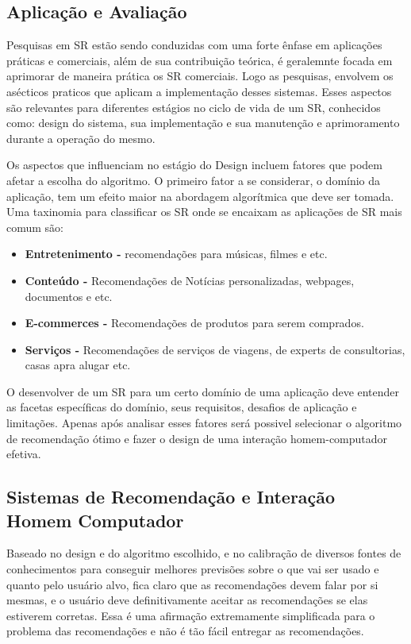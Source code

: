\subsection{Aplicação e Avaliação}
Pesquisas em SR estão sendo conduzidas com uma forte ênfase em aplicações práticas e comerciais, além de sua contribuição teórica, é geralemnte focada em aprimorar de maneira prática os SR comerciais. Logo as pesquisas, envolvem os asécticos praticos que aplicam a implementação desses sistemas. Esses aspectos são relevantes para diferentes estágios no ciclo de vida de um SR, conhecidos como: design do sistema, sua implementação e sua manutenção e aprimoramento durante a operação do mesmo.
\par
Os aspectos que influenciam no estágio do Design incluem fatores que podem afetar a escolha do algoritmo. O primeiro fator a se considerar, o domínio da aplicação, tem um efeito maior na abordagem algorítmica que deve ser tomada. Uma taxinomia para classificar os SR onde se encaixam as aplicações de SR mais comum são:

\begin{itemize}
  \item \textbf{Entretenimento -} recomendações para músicas, filmes e etc.
  \item \textbf{Conteúdo -} Recomendações de Notícias personalizadas, webpages, documentos e etc.
  \item \textbf{E-commerces -} Recomendações de produtos para serem comprados.
  \item \textbf{Serviços -} Recomendações de serviços de viagens, de experts de consultorias, casas apra alugar etc.
\end{itemize}

\par
O desenvolver de um SR para um certo domínio de uma aplicação deve entender as facetas específicas do domínio, seus requisitos, desafios de aplicação e limitações. Apenas após analisar esses fatores será possivel selecionar o algoritmo de recomendação ótimo e fazer o design de uma interação homem-computador efetiva.

\subsection{Sistemas de Recomendação e Interação Homem Computador}

Baseado no design e do algoritmo escolhido, e no calibração de diversos fontes de conhecimentos para conseguir melhores previsões sobre o que vai ser usado e quanto pelo usuário alvo, fica claro que as recomendações devem falar por si mesmas, e o usuário deve definitivamente aceitar as recomendações se elas estiverem corretas. Essa é uma afirmação extremamente simplificada para o problema das recomendações e não é tão fácil entregar as recomendações.

